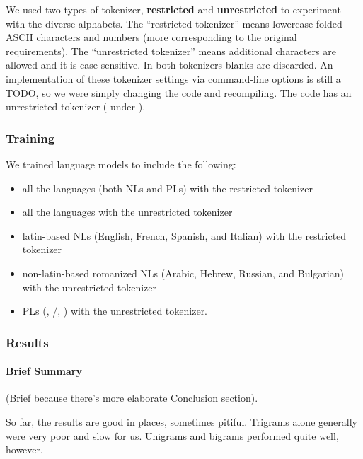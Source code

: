 We used two types of tokenizer, {\bf restricted} and {\bf unrestricted} to experiment with
the diverse alphabets.
The ``restricted tokenizer'' means lowercase-folded ASCII characters and numbers (more corresponding
to the original requirements). The ``unrestricted tokenizer''
means additional characters are allowed and it is case-sensitive.
In both tokenizers blanks are discarded.
An implementation of these tokenizer settings via command-line options is still a TODO,
so we were simply changing the code and recompiling. The code has an unrestricted tokenizer
( under ).


\subsubsection{Training}
\label{sect:lang-ident-training}

We trained language models to include the following:

\begin{itemize}
\item all the languages (both NLs and PLs) with the restricted tokenizer
\item all the languages with the unrestricted tokenizer
\item latin-based NLs (English, French, Spanish, and Italian) with the restricted tokenizer
\item non-latin-based romanized NLs (Arabic, Hebrew, Russian, and Bulgarian) with the unrestricted tokenizer
\item PLs ({\java}, {\C}/{\cpp}, {\perl}) with the unrestricted tokenizer.
\end{itemize}



\subsubsection{Results}

\paragraph{Brief Summary}

(Brief because there's more elaborate Conclusion section).

So far, the results are good in places, sometimes pitiful.
Trigrams alone generally were very poor and slow for us.
Unigrams and bigrams performed quite well, however.

